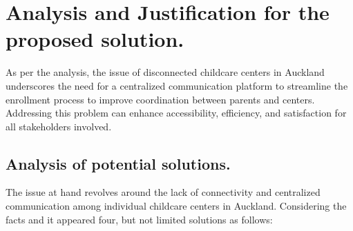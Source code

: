 \section{Analysis and Justification for the proposed solution.}
As per the analysis, the issue of disconnected childcare centers in Auckland underscores the need for a centralized communication platform to streamline the enrollment process to improve coordination between parents and centers. Addressing this problem can enhance accessibility, efficiency, and satisfaction for all stakeholders involved. \par

\subsection{Analysis of potential solutions.}
The issue at hand revolves around the lack of connectivity and centralized communication among individual childcare centers in Auckland. Considering the facts and it appeared four, but not limited solutions as follows: 
